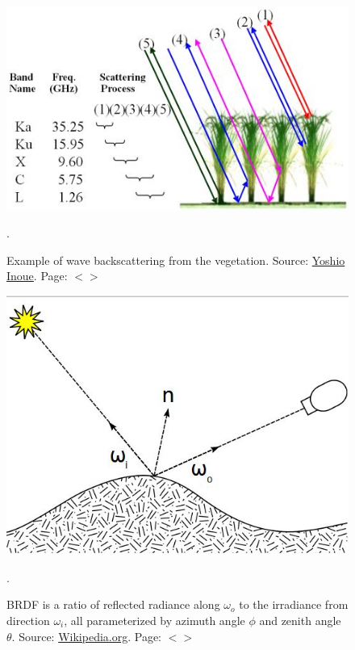 \documentclass[11pt]{article}
\begin{document}
\begin{appendices}
\begin{figure}[H]
	\begin{center}
		\includegraphics[scale=0.6]{backscattering.jpg}
		\caption{Example of wave backscattering from the vegetation. Source: \href{http://cse.niaes.affrc.go.jp/miwa/esid/highlight/microwave-backscatter.html}{Yoshio Inoue}. Page: $<$\pageref{page-11}$>$}.\label{fig:backscat}
	\end{center}
\end{figure}
\begin{figure}[H]
	\begin{center}
		\includegraphics[scale=0.4]{BRDF.jpg}
		\caption{BRDF is a ratio of reflected radiance along $\omega_o$ to the irradiance from direction $\omega_i$, all parameterized by azimuth angle $\phi$ and zenith angle $\theta$. Source: \href{http://en.wikipedia.org/wiki/Portal:Contents/Quick_index}{Wikipedia.org}. Page: $<$\pageref{page-11}$>$}.\label{fig:BRDF}
	\end{center}
\end{figure}


\end{appendices}
\end{document}
